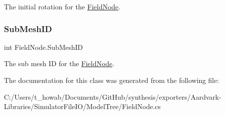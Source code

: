 The initial rotation for the \hyperlink{class_field_node}{Field\+Node}. 

\mbox{\label{class_field_node_ac77c2ba5af3848df490ac82bc1199d3d}} 
\subsubsection{\texorpdfstring{Sub\+Mesh\+ID}{SubMeshID}}
{\footnotesize\ttfamily int Field\+Node.\+Sub\+Mesh\+ID}



The sub mesh ID for the \hyperlink{class_field_node}{Field\+Node}. 



The documentation for this class was generated from the following file\+:\begin{DoxyCompactItemize}
\item 
C\+:/\+Users/t\+\_\+howab/\+Documents/\+Git\+Hub/synthesis/exporters/\+Aardvark-\/\+Libraries/\+Simulator\+File\+I\+O/\+Model\+Tree/Field\+Node.\+cs\end{DoxyCompactItemize}
